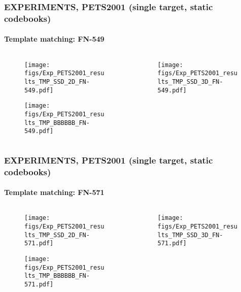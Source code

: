 \begin{frame}
\frametitle{\small EXPERIMENTS, PETS2001 (single target, static codebooks)}
\framesubtitle{Template matching: FN-549}
	\begin{changemargin}{-1.35in}{0in}
	\begin{columns}
		\begin{column}{1.5in}			
			\begin{figure}
				\texttt{[image: figs/Exp\_PETS2001\_results\_TMP\_SSD\_2D\_FN-549.pdf]}
			\end{figure}
			\begin{figure}
				\texttt{[image: figs/Exp\_PETS2001\_results\_TMP\_BBBBBB\_FN-549.pdf]}
			\end{figure}
		\end{column}
		\begin{column}{1.5in}
			\begin{figure}
				\texttt{[image: figs/Exp\_PETS2001\_results\_TMP\_SSD\_3D\_FN-549.pdf]}
			\end{figure}
		\end{column}
	\end{columns}
	\end{changemargin}
\end{frame}




\begin{frame}
\frametitle{\small EXPERIMENTS, PETS2001 (single target, static codebooks)}
\framesubtitle{Template matching: FN-571}
	\begin{changemargin}{-1.35in}{0in}
	\begin{columns}
		\begin{column}{1.5in}			
			\begin{figure}
				\texttt{[image: figs/Exp\_PETS2001\_results\_TMP\_SSD\_2D\_FN-571.pdf]}
			\end{figure}
			\begin{figure}
				\texttt{[image: figs/Exp\_PETS2001\_results\_TMP\_BBBBBB\_FN-571.pdf]}
			\end{figure}
		\end{column}
		\begin{column}{1.5in}
			\begin{figure}
				\texttt{[image: figs/Exp\_PETS2001\_results\_TMP\_SSD\_3D\_FN-571.pdf]}
			\end{figure}
		\end{column}
	\end{columns}
	\end{changemargin}
\end{frame}




